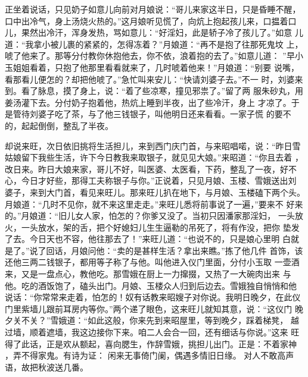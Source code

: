 正坐着说话，只见奶子如意儿向前对月娘说：“哥儿来家这半日，只是昏睡不醒，
口中出冷气，身上汤烧火热的。”这月娘听见慌了，向炕上抱起孩儿来，口揾着口
儿，果然出冷汗，浑身发热，骂如意儿：“好淫妇，此是轿子冷了孩儿了。”如意
儿道：“我拿小被儿裹的紧紧的，怎得冻着？”月娘道：“再不是抱了往那死鬼坟
上，唬了他来了。那等分付教你休抱他去，你不依，浪着抱的去了。”如意儿道：
”早小玉姐姐看着，只抱了他那里看看就来了，几时唬着他来！”月娘道：“别要
说嘴，看那看儿便怎的？却把他唬了。”急忙叫来安儿：“快请刘婆子去。”不一
时，刘婆来到。看了脉息，摸了身上，说：“着了些凉寒，撞见邪祟了。”留了两
服朱砂丸，用姜汤灌下去。分付奶子抱着他，热炕上睡到半夜，出了些冷汗，身上
才凉了。于是管待刘婆子吃了茶，与了他三钱银子，叫他明日还来看看。一家子慌
的要不的，起起倒倒，整乱了半夜。

却说来旺，次日依旧挑将生活担儿，来到西门庆门首，与来昭唱喏，说：“昨日雪
姑娘留下我些生活，许下今日教我来取银子，就见见大娘。”来昭道：“你且去着
，改日来。昨日大娘来家，哥儿不好，叫医婆、太医看，下药，整乱了一夜，好不
心，今日才好些，那得工夫称银子与你。”正说着，只见月娘、玉楼、雪娥送出刘
婆子，来到大门首，看见来旺儿。那来旺儿扒在地下，与月娘、玉楼磕下两个头。
月娘道：“几时不见你，就不来这里走走。”来旺儿悉将前事说了一遍，”要来不
好来的。”月娘道：“旧儿女人家，怕怎的？你爹又没了。当初只因潘家那淫妇，
一头放火，一头放水，架的舌，把个好媳妇儿生生逼勒的吊死了，将有作没，把你
垫发了去。今日天也不容，他往那去了！”来旺儿道：“也说不的，只是娘心里明
白就是了。”说了回话，月娘问他：“卖的是甚样生活？拿出来瞧。”拣了他几件
首饰，该还他三两二钱银子，都用等子称了与他。叫他进入仪门里面，分付小玉取
一壶酒来，又是一盘点心，教他吃。那雪娥在厨上一力撺掇，又热了一大碗肉出来
与他。吃的酒饭饱了，磕头出门。月娘、玉楼众人归到后边去。雪娥独自悄悄和他
说话：“你常常来走着，怕怎的！奴有话教来昭嫂子对你说。我明日晚夕，在此仪
门里紫墙儿跟前耳房内等你。”两个递了眼色，这来旺儿就知其意，说：“这仪门
晚夕关不关？”雪娥道：“如此这般，你来先到来昭屋里，等到晚夕，踩着梯凳，
越过墙，顺着遮墙，我这边接你下来。咱二人会合一回，还有细话与你说。”这来
旺得了此话，正是欢从额起，喜向腮生，作辞雪娥，挑担儿出门。正是：不着家神
，弄不得家鬼。有诗为证：
闲来无事倚门阑，偶遇多情旧日缘。
对人不敢高声语，故把秋波送几番。

